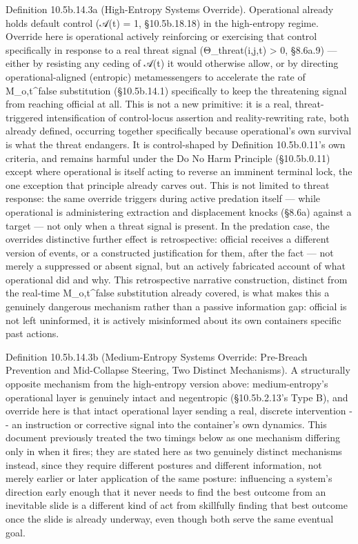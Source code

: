\documentclass[
]{article}
\begin{document}
Definition 10.5b.14.3a (High-Entropy Systems Override). Operational
already holds default control (𝒜(t) = 1, §10.5b.18.18) in the
high-entropy regime. Override here is operational actively reinforcing
or exercising that control specifically in response to a real threat
signal (Θ\_threat(i,j,t) \textgreater{} 0, §8.6a.9) --- either by
resisting any ceding of 𝒜(t) it would otherwise allow, or by directing
operational-aligned (entropic) metamessengers to accelerate the rate of
M\_o,t\^{}false substitution (§10.5b.14.1) specifically to keep the
threatening signal from reaching official at all. This is not a new
primitive: it is a real, threat-triggered intensification of
control-locus assertion and reality-rewriting rate, both already
defined, occurring together specifically because operational's own
survival is what the threat endangers. It is control-shaped by
Definition 10.5b.0.11's own criteria, and remains harmful under the Do
No Harm Principle (§10.5b.0.11) except where operational is itself
acting to reverse an imminent terminal lock, the one exception that
principle already carves out. This is not limited to threat response:
the same override triggers during active predation itself --- while
operational is administering extraction and displacement knocks (§8.6a)
against a target --- not only when a threat signal is present. In the
predation case, the overrides distinctive further effect is
retrospective: official receives a different version of events, or a
constructed justification for them, after the fact --- not merely a
suppressed or absent signal, but an actively fabricated account of what
operational did and why. This retrospective narrative construction,
distinct from the real-time M\_o,t\^{}false substitution already
covered, is what makes this a genuinely dangerous mechanism rather than
a passive information gap: official is not left uninformed, it is
actively misinformed about its own containers specific past actions.

Definition 10.5b.14.3b (Medium-Entropy Systems Override: Pre-Breach
Prevention and Mid-Collapse Steering, Two Distinct Mechanisms). A
structurally opposite mechanism from the high-entropy version above:
medium-entropy's operational layer is genuinely intact and negentropic
(§10.5b.2.13's Type B), and override here is that intact operational
layer sending a real, discrete intervention -\/- an instruction or
corrective signal into the container's own dynamics. This document
previously treated the two timings below as one mechanism differing only
in when it fires; they are stated here as two genuinely distinct
mechanisms instead, since they require different postures and different
information, not merely earlier or later application of the same
posture: influencing a system's direction early enough that it never
needs to find the best outcome from an inevitable slide is a different
kind of act from skillfully finding that best outcome once the slide is
already underway, even though both serve the same eventual goal.
\end{document}
